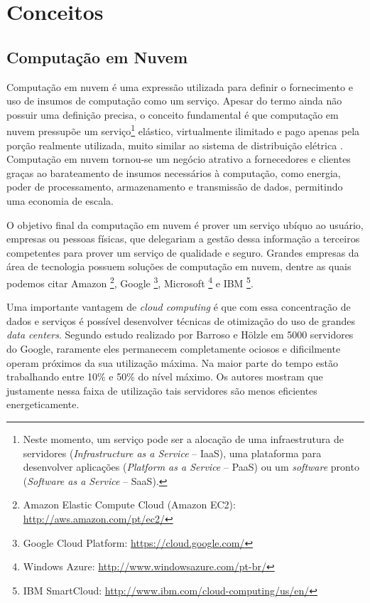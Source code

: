 \chapter{Conceitos}
\label{cap:conceitos}

\section{Computação em Nuvem}
\label{sec:computacao_nuvem}
Computação em nuvem é uma expressão utilizada para definir o fornecimento e uso de
insumos de computação como um serviço. Apesar do termo ainda não possuir uma
definição precisa, o conceito fundamental é que computação em nuvem pressupõe
um serviço\footnote{Neste momento, um serviço pode ser a alocação de
uma infraestrutura de servidores (\emph{Infrastructure as a Service} -- IaaS),
uma plataforma para desenvolver aplicações (\emph{Platform as a Service} -- 
PaaS) ou um \emph{software} pronto (\emph{Software as a Service} -- SaaS).}
elástico, virtualmente ilimitado e pago apenas pela porção realmente
utilizada, muito similar ao sistema de distribuição elétrica 
\cite{eecs:above-clouds}. Computação em nuvem tornou-se um negócio atrativo
a fornecedores e clientes graças ao barateamento de insumos necessários à
computação, como energia, poder de processamento, armazenamento e transmissão de
dados, permitindo uma economia de escala.

O objetivo final da computação em nuvem é prover um 
serviço ubíquo ao usuário, empresas ou pessoas físicas, que delegariam a gestão
dessa informação a terceiros competentes para prover um serviço de qualidade e 
seguro. Grandes empresas da área de tecnologia possuem soluções de computação em
nuvem, dentre as quais podemos citar Amazon \footnote{Amazon Elastic Compute
Cloud (Amazon EC2): \url{http://aws.amazon.com/pt/ec2/}}, Google
\footnote{Google Cloud Platform: \url{https://cloud.google.com/}}, Microsoft
\footnote{Windows Azure: \url{http://www.windowsazure.com/pt-br/}} e IBM
\footnote{IBM SmartCloud: \url{http://www.ibm.com/cloud-computing/us/en/}}.

Uma importante vantagem de \emph{cloud computing} é que com essa concentração de 
dados e serviços é possível desenvolver técnicas de otimização do uso de grandes
\emph{data centers}. Segundo estudo realizado por Barroso e Hölzle
\cite{barroso:case_energy_proportional} em 5000 servidores do Google, raramente
eles permanecem completamente ociosos e dificilmente operam próximos da sua
utilização máxima. Na maior parte do tempo estão trabalhando entre 10\% e 50\% 
do nível máximo. Os autores mostram que justamente nessa faixa de utilização
tais servidores são menos eficientes energeticamente.


